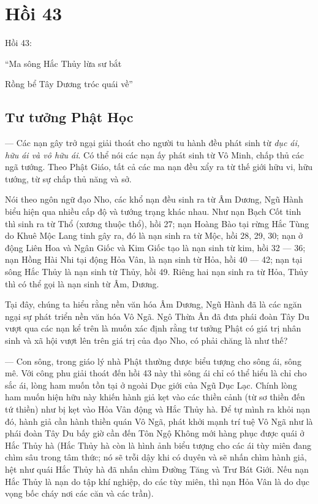 \chapter{Hồi 43} %
\label{cha:hoi_43}

Hồi 43:

\begin{itshape}
``Ma sông Hắc Thủy lừa sư bắt

Rồng bể Tây Dương tróc quái về''
\end{itshape}

\section{Tư tưởng Phật Học} %
\label{sec:43_phat_hoc}

— Các nạn gây trở ngại giải thoát cho người tu hành đều phát sinh từ \emph{dục ái, hữu ái và vô hữu ái}. Có thể nói các nạn ấy phát sinh từ Vô Minh, chấp thủ các ngã tướng. Theo Phật Giáo, tất cả các ma nạn đều xẩy ra từ thế giới hữu vi, hữu tướng, từ sự chấp thủ năng và sở.

Nói theo ngôn ngữ đạo Nho, các khổ nạn đều sinh ra từ Âm Dương, Ngũ Hành biểu hiện qua nhiều cấp độ và tướng trạng khác nhau. Như nạn Bạch Cốt tinh thì sinh ra từ Thổ (xương thuộc thổ), hồi 27; nạn Hoàng Bào tại rừng Hắc Tùng do Khuê Mộc Lang tinh gây ra, đó là nạn sinh ra từ Mộc, hồi 28, 29, 30; nạn ở động Liên Hoa và Ngân Giốc và Kim Giốc tạo là nạn sinh từ kim, hồi 32 — 36; nạn Hồng Hài Nhi tại động Hỏa Vân, là nạn sinh từ Hỏa, hồi 40 — 42; nạn tại sông Hắc Thủy là nạn sinh từ Thủy, hồi 49. Riêng hai nạn sinh ra từ Hỏa, Thủy thì có thể gọi là nạn sinh từ Âm, Dương.

Tại đây, chúng ta hiểu rằng nền văn hóa Âm Dương, Ngũ Hành đã là các ngăn ngại sự phát triển nền văn hóa Vô Ngã. Ngô Thừa Ân đã đưa phái đoàn Tây Du vượt qua các nạn kể trên là muốn xác định rằng tư tưởng Phật có giá trị nhân sinh và xã hội vượt lên trên giá trị của đạo Nho, có phải chăng là như thế?

— Con sông, trong giáo lý nhà Phật thường được biểu tượng cho sông ái, sông mê. Với công phu giải thoát đến hồi 43 này thì sông ái chỉ có thể hiểu là chỉ cho sắc ái, lòng ham muốn tồn tại ở ngoài Dục giới của Ngũ Dục Lạc. Chính lòng ham muốn hiện hữu này khiến hành giả kẹt vào các thiền cảnh (từ sơ thiền đến tứ thiền) như bị kẹt vào Hỏa Vân động và Hắc Thủy hà. Để tự mình ra khỏi nạn đó, hành giả cần hành thiền quán Vô Ngã, phát khởi mạnh trí tuệ Vô Ngã như là phái đoàn Tây Du bấy giờ cần đến Tôn Ngộ Không mới hàng phục được quái ở Hắc Thủy hà (Hắc Thủy hà còn là hình ảnh biểu tượng cho các ái tùy miên đang chìm sâu trong tâm thức; nó sẽ trỗi dậy khi có duyên và sẽ nhấn chìm hành giả, hệt như quái Hắc Thủy hà đã nhấn chìm Đường Tăng và Trư Bát Giới. Nếu nạn Hắc Thủy là nạn do tập khí nghiệp, do các tùy miên, thì nạn Hỏa Vân là do dục vọng bốc cháy nơi các căn và các trần).

